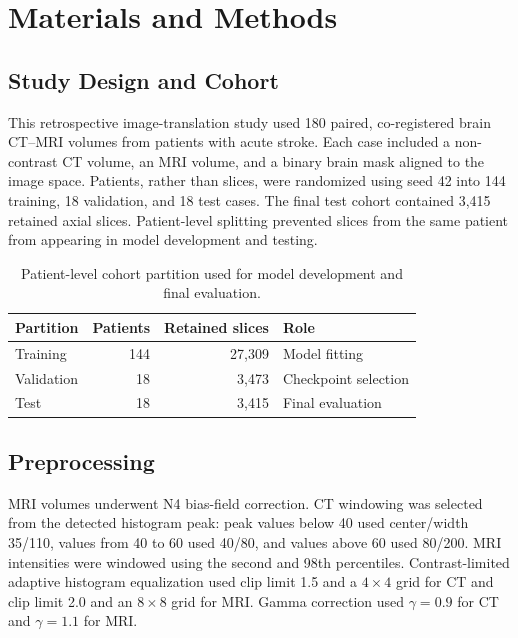 \section{Materials and Methods}

\subsection{Study Design and Cohort}

This retrospective image-translation study used 180 paired, co-registered brain CT--MRI volumes from patients with acute stroke. Each case included a non-contrast CT volume, an MRI volume, and a binary brain mask aligned to the image space. Patients, rather than slices, were randomized using seed 42 into 144 training, 18 validation, and 18 test cases. The final test cohort contained 3,415 retained axial slices. Patient-level splitting prevented slices from the same patient from appearing in model development and testing.



\begin{table}[htbp]
\centering
\caption{Patient-level cohort partition used for model development and final evaluation.}
\label{tab:split}
\begin{tabular}{lrrl}
\toprule
Partition & Patients & Retained slices & Role\\
\midrule
Training & 144 & 27,309 & Model fitting\\
Validation & 18 & 3,473 & Checkpoint selection\\
Test & 18 & 3,415 & Final evaluation\\
\bottomrule
\end{tabular}
\end{table}

\subsection{Preprocessing}

MRI volumes underwent N4 bias-field correction. CT windowing was selected from the detected histogram peak: peak values below 40 used center/width 35/110, values from 40 to 60 used 40/80, and values above 60 used 80/200. MRI intensities were windowed using the second and 98th percentiles. Contrast-limited adaptive histogram equalization used clip limit 1.5 and a $4\times4$ grid for CT and clip limit 2.0 and an $8\times8$ grid for MRI. Gamma correction used $\gamma=0.9$ for CT and $\gamma=1.1$ for MRI.

